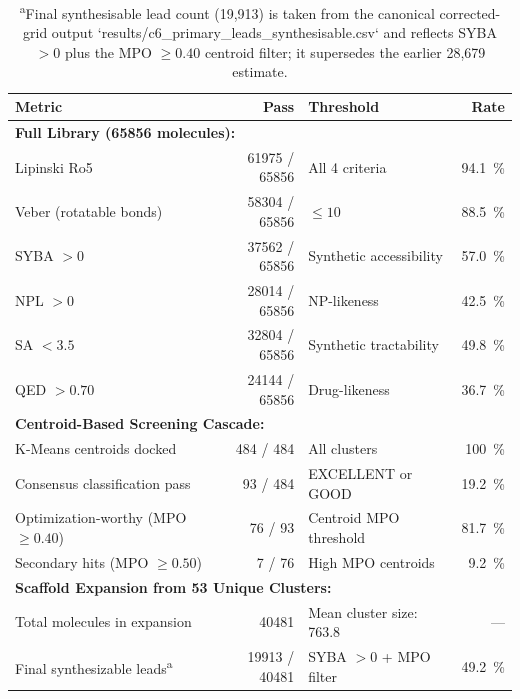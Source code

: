 \documentclass[journal=jcisd8,manuscript=suppinfo]{achemso}
\begin{document}
\begin{table}[!htbp]
\centering
\caption{Aggregate drug-likeness compliance rates across the full \num{65856}-molecule hybrid library and the \num{40481}-molecule scaffold expansion from \num{53} unique optimization-worthy clusters. Tracks Lipinski, Veber, and synthetic accessibility (SYBA) thresholds relevant to experimental developability. \textit{The filtered computational library shows over \qty{94}{\percent} Lipinski compliance and the reported synthetic-accessibility profile; these descriptors do not establish lead quality.}}
\label{tab:druglikeness}
\begin{tabular}{@{}l r l r@{}}
\toprule
\textbf{Metric} & \textbf{Pass} & \textbf{Threshold} & \textbf{Rate} \\
\midrule
\multicolumn{4}{l}{\textbf{Full Library (\num{65856} molecules):}} \\
Lipinski Ro5 & \num{61975} / \num{65856} & All \num{4} criteria & \qty{94.1}{\percent} \\
Veber (rotatable bonds) & \num{58304} / \num{65856} & $\leq \num{10}$ & \qty{88.5}{\percent} \\
SYBA $> \num{0}$ & \num{37562} / \num{65856} & Synthetic accessibility & \qty{57.0}{\percent} \\
NPL $> \num{0}$ & \num{28014} / \num{65856} & NP-likeness & \qty{42.5}{\percent} \\
SA $< \num{3.5}$ & \num{32804} / \num{65856} & Synthetic tractability & \qty{49.8}{\percent} \\
QED $> \num{0.70}$ & \num{24144} / \num{65856} & Drug-likeness & \qty{36.7}{\percent} \\
\midrule
\multicolumn{4}{l}{\textbf{Centroid-Based Screening Cascade:}} \\
K-Means centroids docked & \num{484} / \num{484} & All clusters & \qty{100}{\percent} \\
Consensus classification pass & \num{93} / \num{484} & EXCELLENT or GOOD & \qty{19.2}{\percent} \\
Optimization-worthy (MPO $\geq \num{0.40}$) & \num{76} / \num{93} & Centroid MPO threshold & \qty{81.7}{\percent} \\
Secondary hits (MPO $\geq \num{0.50}$) & \num{7} / \num{76} & High MPO centroids & \qty{9.2}{\percent} \\
\midrule
\multicolumn{4}{l}{\textbf{Scaffold Expansion from \num{53} Unique Clusters:}} \\
Total molecules in expansion & \num{40481} & Mean cluster size: \num{763.8} & --- \\
Final synthesizable leads\textsuperscript{a} & \num{19913} / \num{40481} & SYBA $> 0$ + MPO filter & \qty{49.2}{\percent} \\
\bottomrule
\end{tabular}
\caption*{\textsuperscript{a}Final synthesisable lead count (19,913) is taken from the canonical corrected-grid output `results/c6\_primary\_leads\_synthesisable.csv` and reflects SYBA $>0$ plus the MPO $\geq0.40$ centroid filter; it supersedes the earlier 28,679 estimate.}
\end{table}
\end{document}
